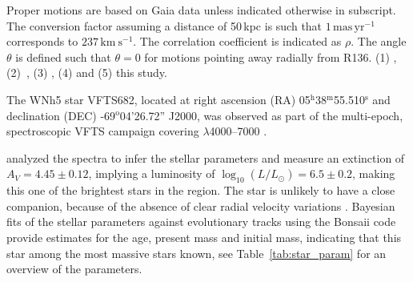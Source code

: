 \documentclass[apjl,twocolumn]{emulateapj}
\newcommand{\kms}{{\,\mathrm{km\ s^{-1}}}}
\newcommand{\masyr}{\,\mathrm{mas}\,\mathrm{yr}^{-1}}
\DeclareRobustCommand{\Tabref}[1]{Table~\ref{#1}}
\DeclareRobustCommand{\Secref}[1]{Sec.~\ref{#1}}
\begin{document}
\begin{table}
\begin{center}
\begin{tabular}{llc|c|c}
    \end{tabular}
    \tablecomments
    { Proper motions are based on Gaia data unless indicated otherwise in subscript.    The conversion factor assuming a distance of 50\,kpc is such that $1\masyr$ corresponds to $237\kms$.  The correlation coefficient is indicated as $\rho$. The angle $\theta$ is defined such that $\theta=0$ for motions pointing away radially from R136.
      (1) \cite{brown:18},
      (2)~\cite{bestenlehner:11},
    (3) \cite{lennon:18}, 
    (4) \cite{platais:18} and
    (5) {\color{blue}this study}.
    }
  \end{center}
  \label{tab:vfts682}
\end{table}



The WNh5 star VFTS682, located at right ascension (RA)
05$^\mathrm{h}$38$^\mathrm{m}$55.510$^\mathrm{s}$  and declination
(DEC) \mbox{-69$^\mathrm{o}$04'26.72''} J2000, was observed as part of the multi-epoch, spectroscopic VFTS campaign covering $\lambda$4000--7000 \citep[][]{evans:11}. 
%
%

\citet{bestenlehner:11}  analyzed the spectra to infer the stellar
parameters and measure an extinction of $A_V=4.45\pm0.12$, implying a
luminosity of $\log_{10}(L/L_\odot) =  6.5\pm0.2$, making this one of
the brightest stars in the region. The star is unlikely to have a
close companion, because of the absence of clear radial velocity
variations \citet{bestenlehner:11}. Bayesian fits of the stellar
parameters against evolutionary tracks \citep{brott:11, kohler:15}
using the Bonsaii code \citep{schneider:17, schneider:18} provide
estimates for the age, present mass and initial mass, indicating that
this star among the most massive stars known, see
\Tabref{tab:star_param} for an overview of the parameters.
\end{document}
